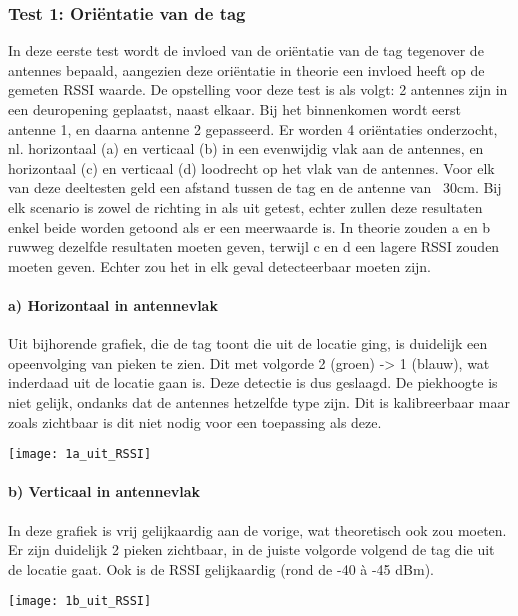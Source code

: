 \subsubsection{Test 1: Oriëntatie van de tag}
In deze eerste test wordt de invloed van de oriëntatie van de tag tegenover de antennes bepaald, aangezien deze oriëntatie in theorie een invloed heeft op de gemeten RSSI waarde. De opstelling voor deze test is als volgt: 2 antennes zijn in een deuropening geplaatst, naast elkaar. Bij het binnenkomen wordt eerst antenne 1, en daarna antenne 2 gepasseerd. Er worden 4 oriëntaties onderzocht, nl. horizontaal (a) en verticaal (b) in een evenwijdig vlak aan de antennes, en horizontaal (c) en verticaal (d) loodrecht op het vlak van de antennes. Voor elk van deze deeltesten geld een afstand tussen de tag en de antenne van ~30cm. Bij elk scenario is zowel de richting in als uit getest, echter zullen deze resultaten enkel beide worden getoond als er een meerwaarde is.
In theorie zouden a en b ruwweg dezelfde resultaten moeten geven, terwijl c en d een lagere RSSI zouden moeten geven. Echter zou het in elk geval detecteerbaar moeten zijn.

\paragraph{a) Horizontaal in antennevlak}
\begin{minipage}{0.55\textwidth}
Uit bijhorende grafiek, die de tag toont die uit de locatie ging, is duidelijk een opeenvolging van pieken te zien. Dit met volgorde 2 (groen) -> 1 (blauw), wat inderdaad uit de locatie gaan is. Deze detectie is dus geslaagd. De piekhoogte is niet gelijk, ondanks dat de antennes hetzelfde type zijn. Dit is kalibreerbaar maar zoals zichtbaar is dit niet nodig voor een toepassing als deze.
\end{minipage}
\hfill
\begin{minipage}{0.42\textwidth}
	\texttt{[image: 1a\_uit\_RSSI]}
\end{minipage}

\paragraph{b) Verticaal in antennevlak}
\begin{minipage}{0.55\textwidth}
In deze grafiek is vrij gelijkaardig aan de vorige, wat theoretisch ook zou moeten. Er zijn duidelijk 2 pieken zichtbaar, in de juiste volgorde volgend de tag die uit de locatie gaat. Ook is de RSSI gelijkaardig (rond de -40 à -45 dBm).
\end{minipage}
\hfill
\begin{minipage}{0.42\textwidth}
	\texttt{[image: 1b\_uit\_RSSI]}
\end{minipage}

